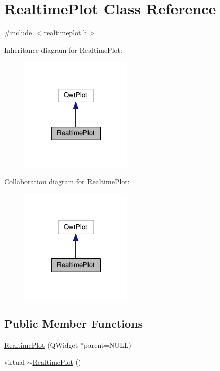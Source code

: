 \hypertarget{class_realtime_plot}{}\section{Realtime\+Plot Class Reference}
\label{class_realtime_plot}


{\ttfamily \#include $<$realtimeplot.\+h$>$}



Inheritance diagram for Realtime\+Plot\+:
\nopagebreak
\begin{figure}[H]
\begin{center}
\leavevmode
\includegraphics[width=153pt]{class_realtime_plot__inherit__graph}
\end{center}
\end{figure}


Collaboration diagram for Realtime\+Plot\+:
\nopagebreak
\begin{figure}[H]
\begin{center}
\leavevmode
\includegraphics[width=153pt]{class_realtime_plot__coll__graph}
\end{center}
\end{figure}
\subsection*{Public Member Functions}
\begin{DoxyCompactItemize}
\item 
\hyperlink{class_realtime_plot_aefce3b75edd9d49d8bba1abd9d22d84a}{Realtime\+Plot} (Q\+Widget $\ast$parent=N\+U\+L\+L)
\item 
virtual \hyperlink{class_realtime_plot_a8b2ed5dbd679c2b75f851ec5eb787da8}{$\sim$\+Realtime\+Plot} ()
\end{DoxyCompactItemize}


